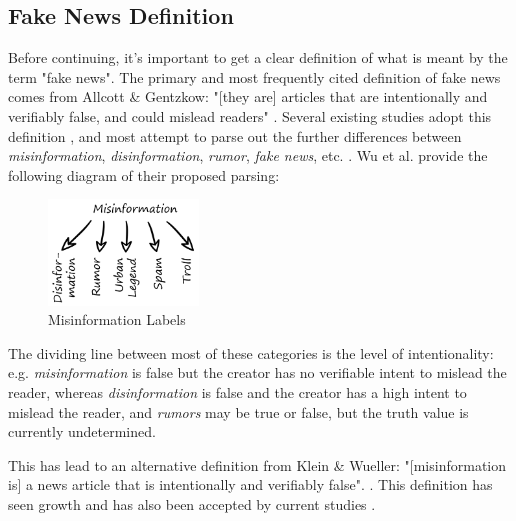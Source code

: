 \documentclass[preprint,review,12pt]{elsarticle}
\begin{document}
\subsection{Fake News Definition}
\label{Fake News Definition Section}
Before continuing, it's important to get a clear definition of what is meant by the term "fake news". The primary and most frequently cited definition of fake news comes from Allcott \& Gentzkow: "[they are] articles that are intentionally and verifiably false, and could mislead readers" \cite{allcott2017social}. Several existing studies adopt this definition \cite{conroy2015automatic,klein2017fake,rubin2015deception,rubin2017deception,mustafaraj2017fake,potthast2017stylometric}, and most attempt to parse out the further differences between \textit{misinformation}, \textit{disinformation}, \textit{rumor}, \textit{fake news}, etc. \cite{zimdars2020fake,  difonzo2007rumor,flynn2017nature,garrett2013undermining,wu2016mining}. Wu et al. provide the following diagram of their proposed parsing:
 \begin{figure}[htp]
    \centering
    \includegraphics[width=4cm]{misinformation graphic.png}
    \caption{Misinformation Labels \cite{wu2016mining}}
    \label{fig:misinformation graphic.png}
\end{figure}


The dividing line between most of these categories is the level of intentionality: e.g. \textit{misinformation} is false but the creator has no verifiable  intent to mislead the reader, whereas \textit{disinformation} is false and the creator has a high intent to mislead the reader, and \textit{rumors} may be true or false, but the truth value is currently undetermined.

This has lead to an alternative definition from Klein \& Wueller: "[misinformation is] a news article that is intentionally and verifiably false". \cite{klein2017fake}. This definition has seen growth and has also been accepted by current studies \cite{shu2017fake, liu2018early}.
\end{document}
